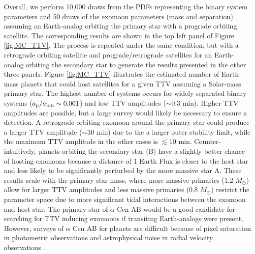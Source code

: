 \documentclass[preprint]{aastex63}
\begin{document}
Overall, we perform 10,000 draws from the PDFs representing the binary system parameters and 50 draws of the exomoon parameters (mass and separation) assuming an Earth-analog orbiting the primary star with a prograde orbiting satellite. The corresponding results are shown in the top left panel of Figure \ref{fig:MC_TTV}. The process is repeated under the same condition, but with a retrograde orbiting satellite and prograde/retrograde satellites for an Earth-analog orbiting the secondary star to generate the results presented in the other three panels.  Figure \ref{fig:MC_TTV} illustrates the estimated number of Earth-mass planets that could host satellites for a given TTV assuming a Solar-mass primary star. The highest number of systems occurs for widely separated binary systems ($a_{\rm p}/a_{\rm bin} \sim 0.001$) and low TTV amplitudes ($\sim$0.3 min).  Higher TTV amplitudes are possible, but a large survey would likely be necessary to ensure a detection.  A retrograde orbiting exomoon around the primary star could produce a larger TTV amplitude ($\sim$30 min) due to the a larger outer stability limit, while the maximum TTV amplitude in the other cases is $\lesssim$10 min.  Counter-intuitively, planets orbiting the secondary star (B) have a slightly better chance of hosting exomoons because a distance of 1 Earth Flux is closer to the host star and less likely to be significantly perturbed by the more massive star A.  These results scale with the primary star mass, where more massive primaries (1.2 $M_\odot$) allow for larger TTV amplitudes and less massive primaries (0.8 $M_\odot$) restrict the parameter space due to more significant tidal interactions between the exomoon and host star.  The primary star of $\alpha$ Cen AB would be a good candidate for searching for TTV inducing exomoons if transiting Earth-analogs were present.  However, surveys of $\alpha$ Cen AB for planets are difficult because of pixel saturation in photometric observations \citep{Demory2015} and astrophysical noise in radial velocity observations \citep{Zhao2018}.
\end{document}
